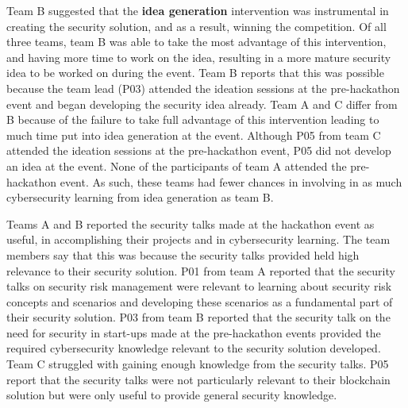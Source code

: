 \documentclass[runningheads]{llncs}
\begin{document}
Team B suggested that the \textbf{idea generation} intervention was instrumental in creating the security solution, and as a result, winning the competition. Of all three teams, team B was able to take the most advantage of this intervention, and having more time to work on the idea, resulting in a more mature security idea to be worked on during the event. Team B reports that this was possible because the team lead (P03) attended the ideation sessions at the pre-hackathon event and began developing the security idea already.
Team A and C differ from B because of the failure to take full advantage of this intervention leading to much time put into idea generation at the event. Although P05 from team C attended the ideation sessions at the pre-hackathon event, P05 did not develop an idea at the event. None of the participants of team A attended the pre-hackathon event.
As such, these teams had fewer chances in involving in as much cybersecurity learning from idea generation as team B.


Teams A and B reported the security talks made at the hackathon event as useful, in accomplishing their projects and in cybersecurity learning. The team members say that this was because the security talks provided held high relevance to their security solution. 
P01 from team A reported that the security talks on security risk management were relevant to learning about security risk concepts and scenarios and developing these scenarios as a fundamental part of their security solution. P03 from team B reported that the security talk on the need for security in start-ups made at the pre-hackathon events provided the required cybersecurity knowledge relevant to the security solution developed.
Team C struggled with gaining enough knowledge from the security talks. P05 report that the security talks were not particularly relevant to their blockchain solution but were only useful to provide general security knowledge.
\end{document}
